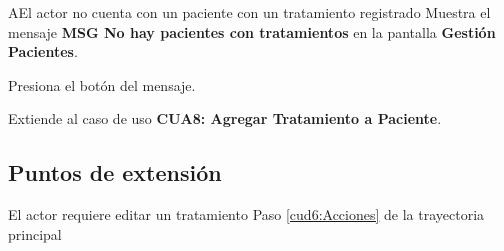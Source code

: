  \begin{UCtrayectoriaA}{A}{El actor no cuenta con un paciente con un tratamiento registrado}
 	\UCpaso Muestra el mensaje \textbf{MSG No hay pacientes con tratamientos} en la pantalla \textbf{Gestión Pacientes}.
 	
 	\UCpaso [\UCactor] Presiona el botón  del mensaje. 

   	\UCpaso Extiende al caso de uso \textbf{CUA8: Agregar Tratamiento a Paciente}.
 \end{UCtrayectoriaA}
 

 
 
\subsection{Puntos de extensión}


\UCExtensionPoint
{El actor requiere editar un tratamiento}
{ Paso \ref{cud6:Acciones} de la trayectoria principal}
{}

 

